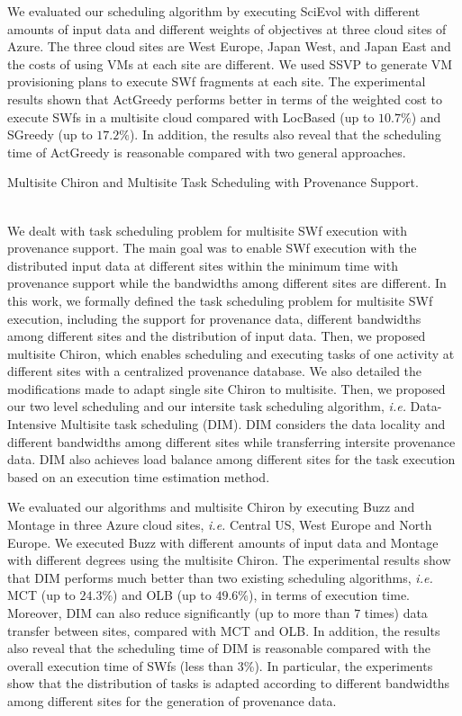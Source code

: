 We evaluated our scheduling algorithm by executing SciEvol with different amounts of input data and different weights of objectives at three cloud sites of Azure. The three cloud sites are West Europe, Japan West, and Japan East and the costs of using VMs at each site are different. We used SSVP to generate VM provisioning plans to execute SWf fragments at each site.
The experimental results shown that ActGreedy performs better in terms of the weighted cost to execute SWfs in a multisite cloud compared with LocBased (up to $10.7\%$) and SGreedy (up to $17.2\%$). In addition, the results also reveal that the scheduling time of ActGreedy is reasonable compared with two general approaches.
\\[12pt]
\noindent \begin{bf}Multisite Chiron and Multisite Task Scheduling with Provenance Support.\end{bf} 
\\[6pt]
\noindent We dealt with task scheduling problem for multisite SWf execution with provenance support. The main goal was to enable SWf execution with the distributed input data at different sites within the minimum time with provenance support while the bandwidths among different sites are different. In this work, we formally defined the task scheduling problem for multisite SWf execution, including the support for provenance data, different bandwidths among different sites and the distribution of input data. Then, we proposed multisite Chiron, which enables scheduling and executing tasks of one activity at different sites with a centralized provenance database. We also detailed the modifications made to adapt single site Chiron to multisite. Then, we proposed our two level scheduling and our intersite task scheduling algorithm, \textit{i.e.} Data-Intensive Multisite task scheduling (DIM). DIM considers the data locality and different bandwidths among different sites while transferring intersite provenance data. DIM also achieves load balance among different sites for the task execution based on an execution time estimation method.

We evaluated our algorithms and multisite Chiron by executing Buzz and Montage in three Azure cloud sites, \textit{i.e.} Central US, West Europe and North Europe. We executed Buzz with different amounts of input data and Montage with different degrees using the multisite Chiron. The experimental results show that DIM performs much better than two existing scheduling algorithms, \textit{i.e.} MCT (up to $24.3\%$) and OLB (up to $49.6\%$), in terms of execution time. Moreover, DIM can also reduce significantly (up to more than $7$ times) data transfer between sites, compared with MCT and OLB. In addition, the results also reveal that the scheduling time of DIM is reasonable compared with the overall execution time of SWfs (less than $3$\%). In particular, the experiments show that the distribution of tasks is adapted according to different bandwidths among different sites for the generation of provenance data.

